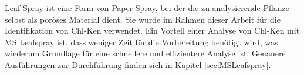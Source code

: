 Leaf Spray ist eine Form von Paper Spray, bei der die zu analysierende Pflanze selbst als poröses Material dient. Sie wurde im Rahmen dieser Arbeit für die Identifikation von \gls{Chl-K}en verwendet. Ein Vorteil einer Analyse von \gls{Chl-K}en mit MS Leafspray ist, dass weniger Zeit für die Vorbereitung benötigt wird, was wiederum Grundlage für eine schnellere und effizientere Analyse ist. Genauere Ausführungen zur Durchführung finden sich in Kapitel \ref{sec:MSLeafspray}.\\